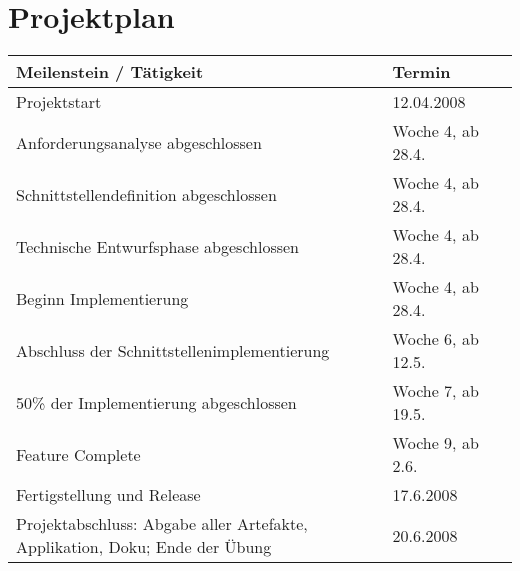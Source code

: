 

\section{Projektplan}
\begin{tabular}{ | p{11.2cm} | p{4cm} | l | }
\hline
\textbf{Meilenstein / Tätigkeit} & \textbf{Termin} \\
\hline
Projektstart & 12.04.2008\\
\hline
Anforderungsanalyse abgeschlossen & Woche 4, ab 28.4.\\
\hline
Schnittstellendefinition abgeschlossen  & Woche 4, ab 28.4.\\
\hline
Technische Entwurfsphase abgeschlossen & Woche 4, ab 28.4.\\
\hline
Beginn Implementierung & Woche 4, ab 28.4.\\
\hline
Abschluss der Schnittstellenimplementierung & Woche 6, ab 12.5.\\
\hline
50\% der Implementierung abgeschlossen & Woche 7, ab 19.5. \\
\hline
Feature Complete & Woche 9, ab 2.6.\\
\hline
Fertigstellung und Release & 17.6.2008 \\
\hline
Projektabschluss: Abgabe aller Artefakte, Applikation, Doku; Ende der Übung & 20.6.2008\\
\hline
\end{tabular}



